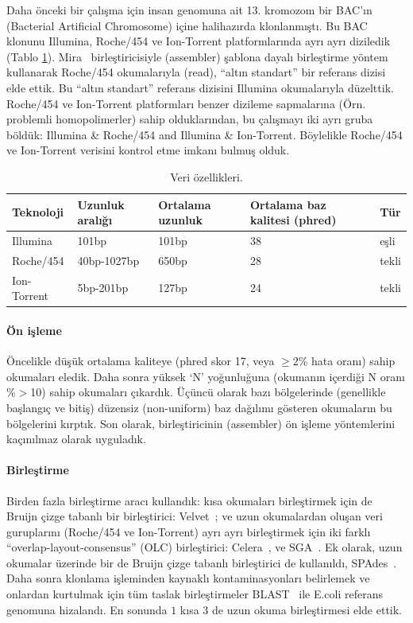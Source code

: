 
Daha önceki bir çalışma için insan genomuna ait 13. kromozom bir BAC'ın (Bacterial Artificial Chromosome) içine halihazırda klonlanmıştı. 
Bu BAC klonunu Illumina, Roche/454 ve Ion-Torrent platformlarında ayrı ayrı diziledik (Tablo \ref{tab:dataprop}).
Mira~\cite{Chevreux1999} birleştiricisiyle (assembler) şablona dayalı birleştirme yöntem kullanarak Roche/454 okumalarıyla (read), ``altın standart'' bir referans dizisi elde ettik. Bu ``altın standart'' referans dizisini Illumina okumalarıyla düzelttik.
Roche/454 ve Ion-Torrent platformları benzer dizileme sapmalarına (Örn. problemli homopolimerler) sahip olduklarından, bu çalışmayı iki ayrı gruba böldük: Illumina \& Roche/454 and Illumina \& Ion-Torrent. Böylelikle Roche/454 ve Ion-Torrent verisini kontrol etme imkanı bulmuş olduk.

\begin{table}[htb]
\begin{tabular}{|l|l|l|l|l|}
\hline
Teknoloji & Uzunluk aralığı & Ortalama uzunluk & Ortalama baz kalitesi (phred) & Tür \\ 
\hline
Illumina & 101bp & 101bp & 38 & eşli \\
Roche/454 & 40bp-1027bp & 650bp & 28 & tekli \\
Ion-Torrent & 5bp-201bp & 127bp & 24 & tekli \\
\hline
\end{tabular}
\caption{Veri özellikleri.}     
\label{tab:dataprop}
\end{table}


\paragraph{Ön işleme} 
Öncelikle düşük ortalama kaliteye (phred skor 17, veya $\geq$2\% hata oranı) sahip okumaları eledik. Daha sonra yüksek `N' yoğunluğuna (okumanın içerdiği N oranı \%$>$10) sahip okumaları çıkardık. Üçüncü olarak bazı bölgelerinde (genellikle başlangıç ve bitiş) düzensiz (non-uniform) baz dağılımı gösteren okumaların bu bölgelerini kırptık. Son olarak, birleştiricinin (assembler) ön işleme yöntemlerini kaçınılmaz olarak uyguladık.

\paragraph{Birleştirme} Birden fazla birleştirme aracı kullandık: kısa okumaları birleştirmek için de Bruijn çizge tabanlı bir birleştirici: Velvet~\cite{Zerbino2008}; ve uzun okumalardan oluşan veri guruplarını (Roche/454 ve Ion-Torrent) ayrı ayrı birleştirmek için iki farklı ``overlap-layout-consensus'' (OLC) birleştirici: Celera~\cite{Myers2000}, ve SGA~\cite{Simpson2012}. Ek olarak, uzun okumalar üzerinde bir de Bruijn çizge tabanlı birleştirici de kullanıldı, SPAdes~\cite{Bankevich2012}. Daha sonra klonlama işleminden kaynaklı kontaminasyonları belirlemek ve onlardan kurtulmak için tüm taslak birleştirmeler BLAST~\cite{Altschul1990} ile E.coli referans genomuna hizalandı. En sonunda $1$ kısa $3$ de uzun okuma birleştirmesi elde ettik.
 
